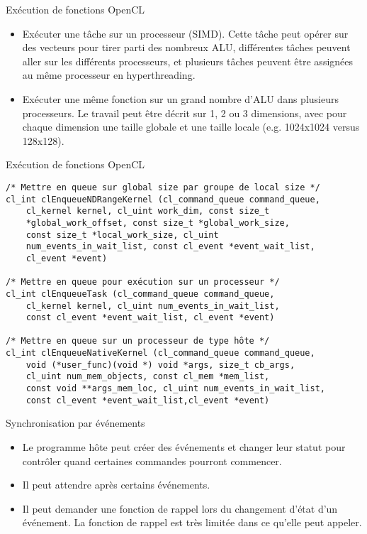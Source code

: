 \documentclass[10pt]{beamer}
\begin{document}
\begin{frame}{Exécution de fonctions OpenCL}

  \begin{itemize}
    \item Exécuter une tâche sur un processeur (SIMD). Cette tâche peut opérer sur des vecteurs pour tirer parti des nombreux ALU, différentes tâches peuvent aller sur les différents processeurs, et plusieurs tâches peuvent être assignées au même processeur en hyperthreading.

    \item Exécuter une même fonction sur un grand nombre d'ALU dans plusieurs processeurs. Le travail peut être décrit sur 1, 2 ou 3 dimensions, avec pour chaque dimension une taille globale et une taille locale (e.g. 1024x1024 versus 128x128).
  \end{itemize}
\end{frame}

\begin{frame}[fragile]{Exécution de fonctions OpenCL}

  \scriptsize
  \begin{verbatim}
/* Mettre en queue sur global size par groupe de local size */
cl_int clEnqueueNDRangeKernel (cl_command_queue command_queue,
    cl_kernel kernel, cl_uint work_dim, const size_t
    *global_work_offset, const size_t *global_work_size,
    const size_t *local_work_size, cl_uint
    num_events_in_wait_list, const cl_event *event_wait_list, 
    cl_event *event)

/* Mettre en queue pour exécution sur un processeur */
cl_int clEnqueueTask (cl_command_queue command_queue,
    cl_kernel kernel, cl_uint num_events_in_wait_list,
    const cl_event *event_wait_list, cl_event *event)

/* Mettre en queue sur un processeur de type hôte */
cl_int clEnqueueNativeKernel (cl_command_queue command_queue,
    void (*user_func)(void *) void *args, size_t cb_args,
    cl_uint num_mem_objects, const cl_mem *mem_list,
    const void **args_mem_loc, cl_uint num_events_in_wait_list,
    const cl_event *event_wait_list,cl_event *event)
  \end{verbatim}
\end{frame}

\begin{frame}{Synchronisation par événements}

  \begin{itemize}
    \item Le programme hôte peut créer des événements et changer leur statut pour contrôler quand certaines commandes pourront commencer.

    \item Il peut attendre après certains événements.

    \item Il peut demander une fonction de rappel lors du changement d'état d'un événement. La fonction de rappel est très limitée dans ce qu'elle peut appeler.
  \end{itemize}
\end{frame}
\end{document}

